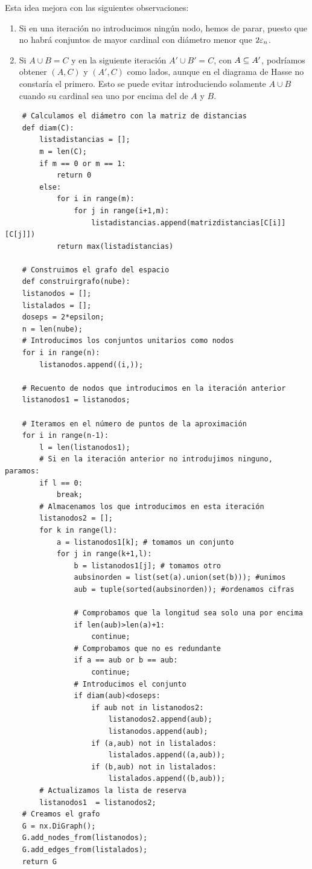 Esta idea mejora con las siguientes observaciones:
\begin{enumerate}
    \item Si en una iteración no introducimos ningún nodo, hemos de parar, puesto que no habrá conjuntos de mayor cardinal con diámetro menor que $ 2\varepsilon_n  $.
    \item Si $ A\cup B = C  $ y en la siguiente iteración $ A'\cup B' = C  $, con $ A \subseteq A'  $, podríamos obtener $ (A,C ) $ y $ (A',C ) $ como lados, aunque en el diagrama de Hasse no constaría el primero. Esto se puede evitar introduciendo solamente $ A\cup B  $ cuando su cardinal sea uno por encima del de $ A  $ y $ B  $.
\end{enumerate}

\begin{verbatim}
    # Calculamos el diámetro con la matriz de distancias
    def diam(C):
        listadistancias = [];
        m = len(C);
        if m == 0 or m == 1:
            return 0
        else:
            for i in range(m):
                for j in range(i+1,m):
                    listadistancias.append(matrizdistancias[C[i]][C[j]])
            return max(listadistancias)
    
    # Construimos el grafo del espacio
    def construirgrafo(nube):
    listanodos = [];
    listalados = [];
    doseps = 2*epsilon;
    n = len(nube);
    # Introducimos los conjuntos unitarios como nodos
    for i in range(n):
        listanodos.append((i,));

    # Recuento de nodos que introducimos en la iteración anterior
    listanodos1 = listanodos; 

    # Iteramos en el número de puntos de la aproximación
    for i in range(n-1):
        l = len(listanodos1);
        # Si en la iteración anterior no introdujimos ninguno, paramos:
        if l == 0:
            break;
        # Almacenamos los que introducimos en esta iteración
        listanodos2 = []; 
        for k in range(l):
            a = listanodos1[k]; # tomamos un conjunto
            for j in range(k+1,l):
                b = listanodos1[j]; # tomamos otro
                aubsinorden = list(set(a).union(set(b))); #unimos
                aub = tuple(sorted(aubsinorden)); #ordenamos cifras

                # Comprobamos que la longitud sea solo una por encima
                if len(aub)>len(a)+1:
                    continue;
                # Comprobamos que no es redundante
                if a == aub or b == aub: 
                    continue;
                # Introducimos el conjunto 
                if diam(aub)<doseps:
                    if aub not in listanodos2:
                        listanodos2.append(aub);
                        listanodos.append(aub);
                    if (a,aub) not in listalados:
                        listalados.append((a,aub));
                    if (b,aub) not in listalados:
                        listalados.append((b,aub));
        # Actualizamos la lista de reserva
        listanodos1  = listanodos2; 
    # Creamos el grafo
    G = nx.DiGraph();
    G.add_nodes_from(listanodos);
    G.add_edges_from(listalados);
    return G
\end{verbatim}

